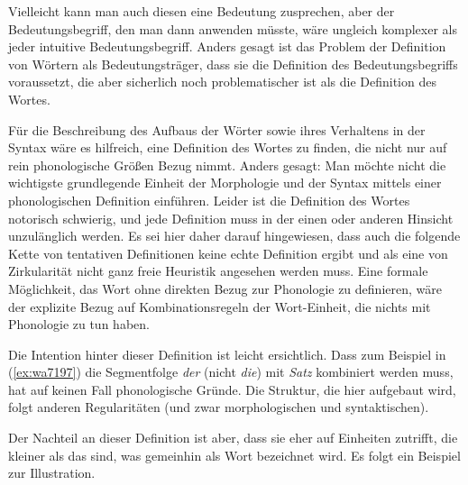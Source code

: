 \begin{exe}
\end{exe}

Vielleicht kann man auch diesen eine Bedeutung zusprechen, aber der Bedeutungsbegriff, den man dann anwenden müsste, wäre ungleich komplexer als jeder intuitive Bedeutungsbegriff.
Anders gesagt ist das Problem der Definition von Wörtern als Bedeutungsträger, dass sie die Definition des Bedeutungsbegriffs voraussetzt, die aber sicherlich noch problematischer ist als die Definition des Wortes.

Für die Beschreibung des Aufbaus der Wörter sowie ihres Verhaltens in der Syntax wäre es hilfreich, eine Definition des Wortes zu finden, die nicht nur auf rein phonologische Größen Bezug nimmt.
Anders gesagt:
Man möchte nicht die wichtigste grundlegende Einheit der Morphologie und der Syntax mittels einer phonologischen Definition einführen.
Leider ist die Definition des Wortes notorisch schwierig, und jede Definition muss in der einen oder anderen Hinsicht unzulänglich werden.
Es sei hier daher darauf hingewiesen, dass auch die folgende Kette von tentativen Definitionen keine echte Definition ergibt und als eine von Zirkularität nicht ganz freie Heuristik angesehen werden muss.
Eine formale Möglichkeit, das Wort ohne direkten Bezug zur Phonologie zu definieren, wäre der explizite Bezug auf Kombinationsregeln der Wort-Einheit, die nichts mit Phonologie zu tun haben.


Die Intention hinter dieser Definition ist leicht ersichtlich.
Dass zum Beispiel in (\ref{ex:wa7197}) die Segmentfolge \textit{der} (nicht \textit{die}) mit \textit{Satz} kombiniert werden muss, hat auf keinen Fall phonologische Gründe.
Die Struktur, die hier aufgebaut wird, folgt anderen Regularitäten (und zwar morphologischen und syntaktischen).

\begin{exe}
  \ex\label{ex:wa7197}
  \begin{xlist}
  \end{xlist}
\end{exe}

Der Nachteil an dieser Definition ist aber, dass sie eher auf Einheiten zutrifft, die kleiner als das sind, was gemeinhin als Wort bezeichnet wird.
Es folgt ein Beispiel zur Illustration.

